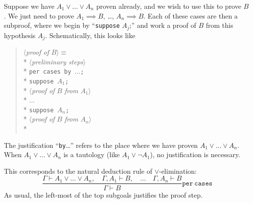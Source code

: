 \begin{node}\label{mizar-000A}%
Suppose we have $A_{1}\lor\dots\lor A_{n}$ proven already, and we wish
to use this to prove $B$. We just need to prove $A_{1}\implies B$,
\dots, $A_{n}\implies B$. Each of these cases are then a subproof, where
we begin by ``\texttt{suppose} $A_{j}$;'' and work a proof of $B$ from
this hypothesis $A_{j}$. Schematically, this looks like
\begin{verse}
$\langle$\emph{proof of \/}$B\rangle \equiv$\\*
\qquad $\langle$\emph{preliminary steps\/}$\rangle$\\*
\qquad \texttt{per cases by }$\ldots$\texttt{;}\\*
\qquad \texttt{suppose }$A_{1}$\texttt{;}\\*
\qquad\quad $\langle$\emph{proof of \/}$B$ \emph{from \/}$A_{1}\rangle$\\*
\qquad $\ldots$\\*
\qquad \texttt{suppose }$A_{n}$\texttt{;}\\*
\qquad\quad $\langle$\emph{proof of \/}$B$ \emph{from \/}$A_{n}\rangle$\\*
\end{verse}
The justification ``\texttt{by}\dots'' refers to the place where we have
proven $A_{1}\lor\dots\lor A_{n}$. When $A_{1}\lor\dots\lor A_{n}$ is a
tautology (like $A_{1}\lor\neg A_{1}$), no justification is necessary.

This corresponds to the natural deduction rule of $\lor$-elimination:
\[\frac{\Gamma\vdash A_{1}\lor\dots\lor A_{n},\quad\Gamma,A_{1}\vdash B,\quad\dots\quad\Gamma,A_{n}\vdash B}{\Gamma\vdash B}\mathtt{per\ cases}\]
As usual, the left-most of the top subgoals justifies the proof step.
\end{node}

